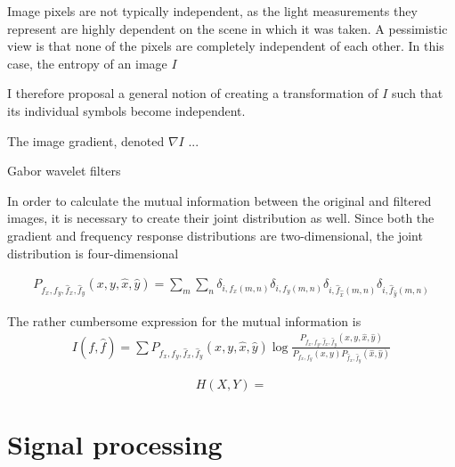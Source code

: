 Image pixels are not typically independent, as the light measurements they represent are highly dependent on the scene in which it was taken. A pessimistic view is that none of the pixels are completely independent of each other. In this case, the entropy of an image $I$ 

I therefore proposal a general notion of creating a transformation of $I$ such that its individual symbols become independent. 

The image gradient, denoted $\nabla I$ ...

Gabor wavelet filters 

In order to calculate the mutual information between the original and filtered images, it is necessary to create their joint distribution as well. Since both the gradient and frequency response distributions are two-dimensional, the joint distribution is four-dimensional

\begin{multline}
    P_{f_x, f_y, \hat{f}_x, \hat{f}_y}(x, y, \hat{x}, \hat{y}) = \sum_m\sum_n \delta_{i, f_x(m, n)}\delta_{i, f_y(m, n)}\delta_{i, \hat{f}_{\hat{x}}(m, n)}\delta_{i, \hat{f}_{\hat{y}}(m, n)}
\end{multline}

The rather cumbersome expression for the mutual information is
\begin{multline}
    I(f, \hat{f}) = \sum P_{f_x, f_y, \hat{f}_x, \hat{f}_y}(x, y, \hat{x}, \hat{y}) \log \frac{P_{f_x, f_y, \hat{f}_x, \hat{f}_y}(x, y, \hat{x}, \hat{y})}{P_{f_x, f_y}(x, y)P_{\hat{f}_x, \hat{f}_y}(\hat{x}, \hat{y})}
\end{multline}



\begin{equation}
    H(X, Y) = 
\end{equation}


\section{Signal processing}



